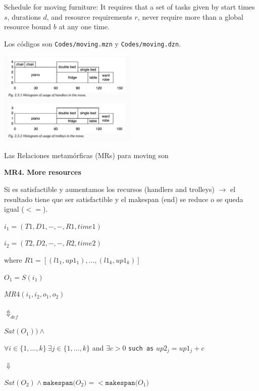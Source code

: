 Schedule for moving furniture:
It requires that a set of tasks given by start times $s$, durations $d$, and resource requirements $r$, never require more than a global resource bound $b$ at any one time.

Los códigos son \texttt{Codes/moving.mzn} y \texttt{Codes/moving.dzn}.

%

%


    \includegraphics[width=0.5\textwidth]{Figures/movingFurniture.jpg}











Las Relaciones metamórficas (MRs) para moving son 

\begin{framed}
    \textbf{MR4. More resources} 
    
    Si es satisfactible y aumentamos los recursos  (handlers and trolleys) $\rightarrow$  el resultado tiene que ser satisfactible y el makespan (end) se reduce o se queda igual ($<=$).
\end{framed}

$ i_1 = (T1, D1, - , - , R1 , time1 )$

$ i_2 = (T2, D2, - , - , R2 , time2 )$

where 
$R1 = [(l1_1,up1_1), \dots, (l1_k,up1_k)]$

$O_1 = S(i_1)$ 
 
\begin{framed}
\begin{center}
$MR4(i_1,i_2,o_1,o_2)$

$ \Updownarrow_{def}$

$Sat (O_1)) \wedge$ 

$\forall i \in \{1,\dots,k\} \ \exists j \in \{1,\dots,k\}$ and $\exists c >0$ \texttt{such as} $up2_j = up1_j + c $  

$\Downarrow$

$Sat(O_2) \wedge  \texttt{makespan($O_2$)} =< \texttt{makespan($O_1$)} $
\end{center}
\end{framed}



